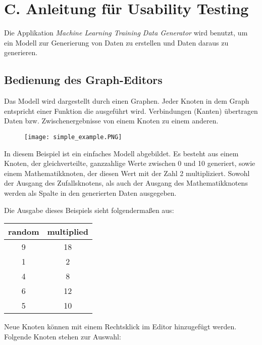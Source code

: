 \section*{C. Anleitung für Usability Testing}
Die Applikation \textit{Machine Learning Training Data Generator} wird benutzt, um ein Modell zur Generierung von Daten zu erstellen und Daten daraus zu generieren.

\subsection*{Bedienung des Graph-Editors}

Das Modell wird dargestellt durch einen Graphen. Jeder Knoten in dem Graph entspricht einer Funktion die ausgeführt wird. Verbindungen (Kanten) übertragen Daten bzw. Zwischenergebnisse von einem Knoten zu einem anderen.

\begin{figure}[H]
    \centering
    \texttt{[image: simple\_example.PNG]}
\end{figure}

In diesem Beispiel ist ein einfaches Modell abgebildet. Es besteht aus einem Knoten, der gleichverteilte, ganzzahlige Werte zwischen 0 und 10 generiert, sowie einem Mathematikknoten, der diesen Wert mit der Zahl 2 multipliziert. Sowohl der Ausgang des Zufallsknotens, als auch der Ausgang des Mathematikknotens werden als Spalte in den generierten Daten ausgegeben.

Die Ausgabe dieses Beispiels sieht folgendermaßen aus:
\begin{table}[H]
    \centering
    \setlength\extrarowheight{-5pt}
    \begin{tabular}{ | c | c | }
        \hline
        random & multiplied \\
        \hline
        9 & 18 \\
        1 & 2 \\
        4 & 8 \\
        6 & 12 \\
        5 & 10 \\
        \hline
    \end{tabular}
\end{table}

Neue Knoten können mit einem Rechtsklick im Editor hinzugefügt werden. Folgende Knoten stehen zur Auswahl:

